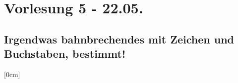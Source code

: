 \section{Vorlesung 5 - 22.05.}
\subsection{Irgendwas bahnbrechendes mit Zeichen und Buchstaben, bestimmt!}
[0cm]
